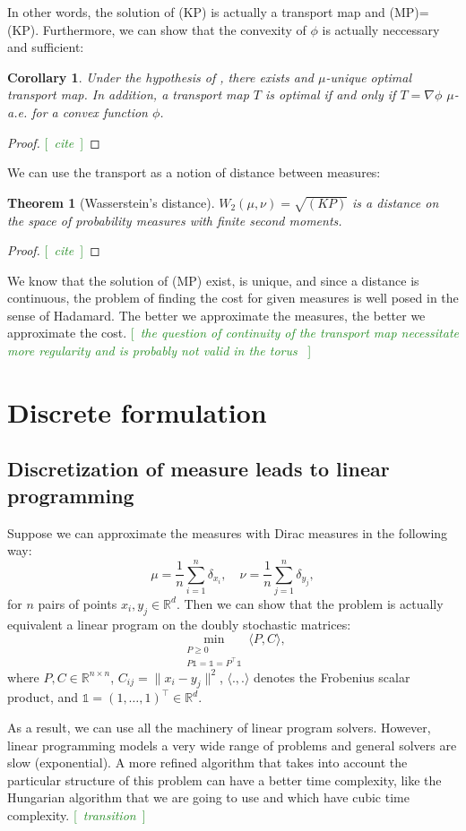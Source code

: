 \documentclass[a4paper]{article}
\newtheorem{theoreme}{Theorem} %
\newtheorem{corollaire}{Corollary} %
\theoremstyle{definition}
\theoremstyle{remark}
\newcommand{\R}{\mathbb{R}}
\newcommand{\un}{\mathds{1}}
\newcommand{\com}[1]{\textcolor{ForestGreen}{[~\emph{#1}~]}}
\newcommand{\ps}[2]{\langle#1,#2\rangle}
\begin{document}
In other words, the solution of (KP) is actually a transport map and (MP)=(KP). Furthermore, we can show that the convexity of $\phi$ is actually neccessary and sufficient:
 \begin{corollaire}
    Under the hypothesis of , there exists and $\mu$-unique optimal transport map. In addition, a transport map $T$ is optimal if and only if $T=\nabla\phi$ $\mu$-a.e. for a convex function $\phi$.
 \end{corollaire}
 \begin{proof} \com{cite}\end{proof}
We can use the transport as a notion of distance between measures:
\begin{theoreme}[Wasserstein's distance] \label{thm:wasserstein}
    $W_2(\mu,\nu) = \sqrt{(KP)}$ is a distance on the space of probability measures with finite second moments.
\end{theoreme}
\begin{proof} \com{cite}\end{proof}
We know that the solution of (MP) exist, is unique, and since a distance is continuous, the problem of finding the cost for given measures is well posed in the sense of Hadamard. The better we approximate the measures, the better we approximate the cost. \com{the question of continuity of the transport map necessitate more regularity and is probably not valid in the torus }


\section{Discrete formulation}
\subsection{Discretization of measure leads to linear programming}
Suppose we can approximate the measures with Dirac measures in the following way:
$$\mu = \frac{1}{n}\sum_{i=1}^n \delta_{x_i}, \quad \nu = \frac{1}{n}\sum_{j=1}^n \delta_{y_j},$$
for $n$ pairs of points $x_i,y_j\in \R^d$. Then we can show that the problem is actually equivalent a linear program on the doubly stochastic matrices:
\[ \min_{\substack{P\geq0 \\ P\un=\un=P^\top\un}} \ps{P}{C}, \]
where $P,C\in\R^{n\times n}$, $C_{ij}=\|x_i-y_j\|^2$, $\ps{.}{.}$ denotes the Frobenius scalar product, and $\un=(1,\dots,1)^\top\in\R^d$.

As a result, we can use all the machinery of linear program solvers. However, linear programming models a very wide range of problems and general solvers are slow (exponential). A more refined algorithm that takes into account the particular structure of this problem can have a better time complexity, like the Hungarian algorithm that we are going to use and which have cubic time complexity.
\com{transition}
\end{document}
